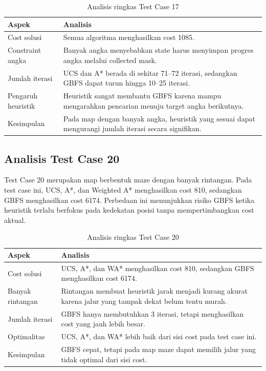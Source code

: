 \begin{table}[H]
	\centering
	\caption{Analisis ringkas Test Case 17}
	\begin{tabular}{|p{4cm}|p{10cm}|}
		\hline
		\rowcolor{blue!15}
		\textbf{Aspek} & \textbf{Analisis} \\
		\hline
		Cost solusi & Semua algoritma menghasilkan cost 1085. \\
		\hline
		Constraint angka & Banyak angka menyebabkan state harus menyimpan progres angka melalui collected mask. \\
		\hline
		Jumlah iterasi & UCS dan A* berada di sekitar 71--72 iterasi, sedangkan GBFS dapat turun hingga 10--25 iterasi. \\
		\hline
		Pengaruh heuristik & Heuristik sangat membantu GBFS karena mampu mengarahkan pencarian menuju target angka berikutnya. \\
		\hline
		Kesimpulan & Pada map dengan banyak angka, heuristik yang sesuai dapat mengurangi jumlah iterasi secara signifikan. \\
		\hline
	\end{tabular}
\end{table}

\subsection{Analisis Test Case 20}

Test Case 20 merupakan map berbentuk maze dengan banyak rintangan. 
Pada test case ini, UCS, A*, dan Weighted A* menghasilkan cost 810, sedangkan GBFS menghasilkan cost 6174. 
Perbedaan ini menunjukkan risiko GBFS ketika heuristik terlalu berfokus pada kedekatan posisi tanpa mempertimbangkan cost aktual.

\begin{table}[H]
	\centering
	\caption{Analisis ringkas Test Case 20}
	\begin{tabular}{|p{4cm}|p{10cm}|}
		\hline
		\rowcolor{orange!20}
		\textbf{Aspek} & \textbf{Analisis} \\
		\hline
		Cost solusi & UCS, A*, dan WA* menghasilkan cost 810, sedangkan GBFS menghasilkan cost 6174. \\
		\hline
		Banyak rintangan & Rintangan membuat heuristik jarak menjadi kurang akurat karena jalur yang tampak dekat belum tentu murah. \\
		\hline
		Jumlah iterasi & GBFS hanya membutuhkan 3 iterasi, tetapi menghasilkan cost yang jauh lebih besar. \\
		\hline
		Optimalitas & UCS, A*, dan WA* lebih baik dari sisi cost pada test case ini. \\
		\hline
		Kesimpulan & GBFS cepat, tetapi pada map maze dapat memilih jalur yang tidak optimal dari sisi cost. \\
		\hline
	\end{tabular}
\end{table}

